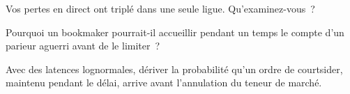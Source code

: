 \begin{interviewq}\label{iq:hf:prediction-and-sports-market-making:4}
Vos pertes en direct ont triplé dans une seule ligue. Qu'examinez-vous~?
\end{interviewq}

\begin{interviewq}\label{iq:hf:prediction-and-sports-market-making:5}
Pourquoi un bookmaker pourrait-il accueillir pendant un temps le compte d'un parieur aguerri avant de le limiter~?
\end{interviewq}

\begin{interviewq}\label{iq:hf:prediction-and-sports-market-making:6}
Avec des latences lognormales, dériver la probabilité qu'un ordre de courtsider, maintenu pendant le délai, arrive avant l'annulation du teneur de marché.
\end{interviewq}
